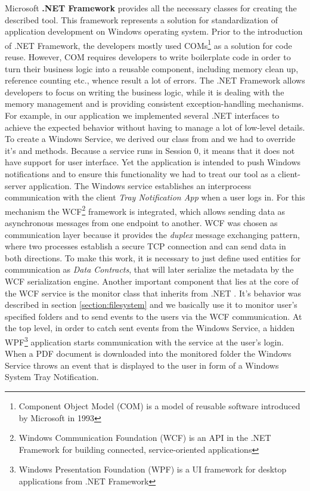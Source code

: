 Microsoft \textbf{.NET Framework} provides all the necessary classes for creating the described tool. This framework represents a solution for standardization of application development on Windows operating system. Prior to the introduction of .NET Framework, the developers mostly used COMs\footnote{Component Object Model (COM) is a model of reusable software introduced by Microsoft in 1993} as a solution for code reuse. However, COM requires developers to write boilerplate code in order to turn their business logic into a reusable component, including memory clean up, reference counting etc., whence result a lot of errors. The .NET Framework allows developers to focus on writing the business logic, while it is dealing with the memory management and is providing consistent exception-handling mechanisms. For example, in our application we implemented several .NET interfaces to achieve the expected behavior without having to manage a lot of low-level details. To create a Windows Service, we derived our class from  and we had to override it's  and  methods. Because a service runs in Session 0, it means that it does not have support for user interface. Yet the application is intended to push Windows notifications and to ensure this functionality we had to treat our tool as a client-server application. The Windows service establishes an interprocess communication with the client \textit{Tray Notification App} when a user logs in. For this mechanism the WCF\footnote{Windows Communication Foundation (WCF) is an API in the .NET Framework for building connected, service-oriented applications} framework is integrated, which allows sending data as asynchronous messages from one endpoint to another. WCF was chosen as communication layer because it provides the \textit{duplex} message exchanging pattern, where two processes establish a secure TCP connection and can send data in both directions. To make this work, it is necessary to just define used entities for communication as \textit{Data Contracts}, that will later serialize the metadata by the WCF serialization engine. Another important component that lies at the core of the WCF service is the monitor class that inherits from .NET . It's behavior was described in section \ref{section:filesystem} and we basically use it to monitor user's specified folders and to send events to the users via the WCF communication. At the top level, in order to catch sent events from the Windows Service, a hidden WPF\footnote{Windows Presentation Foundation (WPF) is a UI framework for desktop applications from .NET Framework} application starts communication with the service at the user's login. When a PDF document is downloaded into the monitored folder the Windows Service throws an event that is displayed to the user in form of a Windows System Tray Notification.


